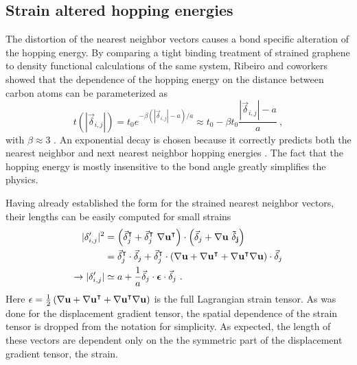 \subsection{Strain altered hopping energies}
The distortion of the nearest neighbor vectors causes a bond specific alteration of the hopping energy.
By comparing a tight binding treatment of strained graphene to density functional calculations of the same system, Ribeiro and coworkers showed that the dependence of the hopping energy on the distance between carbon atoms can be parameterized as
\begin{equation}
  t(|\vec{\delta}_{i,j}|)=t_0 e^{-\beta (|\vec{\delta}_{i,j}|-a)/a} \approx t_0- \beta t_0 \frac{|\vec{\delta}_{i,j}|-a}{a}\ , 
  \label{eq:PVP:hopp}
\end{equation}
with $\beta\approx 3$ \cite{Ribeiro2009}.
An exponential decay is chosen because it correctly predicts both the nearest neighbor and next nearest neighbor hopping energies \cite{Pereira2009}.
The fact that the hopping energy is mostly insensitive to the bond angle greatly simplifies the physics.

Having already established the form for the strained nearest neighbor vectors, their lengths can be easily computed for small strains
\begin{align*}
  |\delta'_{i,j}|^2&=\left(\vec{\delta}_{j}^{\intercal}+\vec{\delta}_{j}^{\intercal} \ \bf{\nabla u}^{\intercal} \right) \cdot
    \left(\vec{\delta}_{j}+\bf{\nabla u} \ \vec{\delta}_{j} \right) \\
    &=\vec{\delta}_{j}^{\intercal} \cdot \vec{\delta}_{j}+
      \vec{\delta}_{j}^{\intercal} \cdot \left(\bf{\nabla u}+\bf{\nabla u}^{\intercal}
      +\bf{\nabla u}^{\intercal}\bf{\nabla u} \right) \cdot \vec{\delta}_{j} \\
  \rightarrow |\delta'_{i,j}|&\simeq a+\frac{1}{a} \vec{\delta}_{j} \cdot \bm{\epsilon} \cdot \vec{\delta}_{j} \ .
\end{align*}
Here $\epsilon=\frac{1}{2} \left(\bf{\nabla u}+\bf{\nabla u}^{\intercal}+\bf{\nabla u}^{\intercal}\bf{\nabla u} \right)$ is the full Lagrangian strain tensor.
As was done for the displacement gradient tensor, the spatial dependence of the strain tensor is dropped from the notation for simplicity.
As expected, the length of these vectors are dependent only on the the symmetric part of the displacement gradient tensor, the strain.

